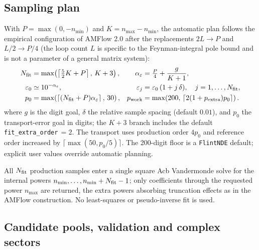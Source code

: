 \documentclass[11pt,a4paper]{article}
\begin{document}
\subsection{Sampling plan}
\label{sec:sampling-plan}

With $P=\max(0,-n_{\min})$ and $K=n_{\max}-n_{\min}$, the automatic plan follows the
empirical configuration of AMFlow 2.0 \cite{Huang:2026rjb} after the replacements
$2L\to P$ and $L/2\to P/4$ (the loop count $L$ is specific to the Feynman-integral pole
bound and is not a parameter of a general matrix system):
\begin{align}
  N_{\rm fit}&=\max\!\left(\left\lceil\tfrac52K+P\right\rceil,\,K+3\right),
  &\alpha_\varepsilon&=\tfrac P4+\frac{g}{K+1},\nonumber\\
  \varepsilon_0&\simeq10^{-\alpha_\varepsilon},
  &\varepsilon_j&=\varepsilon_0\,(1+j\,\delta),\quad j=1,\ldots,N_{\rm fit},
  \label{eq:sampling-plan}\\
  p_0&=\max\!\left(\left\lceil(N_{\rm fit}+P)\alpha_\varepsilon\right\rceil,\,30\right),
  &p_{\rm work}&=\max\!\left(200,\,\left\lceil2(1+p_{\rm extra})p_0\right\rceil\right).
  \nonumber
\end{align}
where $g$ is the digit goal, $\delta$ the relative sample spacing (default $0.01$), and
$p_0$ the transport-error goal in digits; the $K+3$ branch includes the default
\texttt{fit\_extra\_order}$\,=2$. The transport uses production order $4p_0$ and
reference order increased by $\lceil\max(50,p_0/5)\rceil$. The 200-digit floor is a
\texttt{FlintNDE} default; explicit user values override automatic planning.

All $N_{\rm fit}$ production samples enter a single square Acb Vandermonde solve for the
internal powers $n_{\min},\ldots,n_{\min}+N_{\rm fit}-1$; only coefficients through the
requested power $n_{\max}$ are returned, the extra powers absorbing truncation effects as
in the AMFlow construction. No least-squares or pseudo-inverse fit is used.

\subsection{Candidate pools, validation and complex sectors}
\label{sec:pools}
\end{document}
